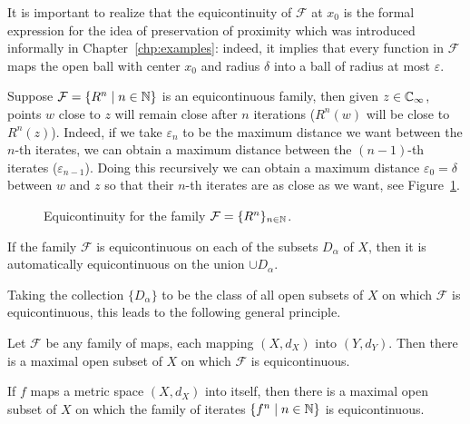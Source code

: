 It is important to realize that the equicontinuity of $\mathcal{F}$ at $x_0$ is
the formal expression for the idea of preservation of proximity which was
introduced informally in Chapter~\ref{chp:examples}: indeed, it implies that
every function in $\mathcal{F}$ maps the open ball with center $x_0$ and radius
$\delta$ into a ball of radius at most $\varepsilon$.

Suppose $\mathcal{F} = \{R^n \mid n \in \mathbb{N}\}$ is an equicontinuous family, then
given $z \in \mathbb{C}_\infty$, points $w$ close to $z$ will remain close after $n$
iterations ($R^n(w)$ will be close to $R^n(z)$). Indeed, if we take
$\varepsilon_n$ to be the maximum distance we want between the $n$-th iterates,
we can obtain a maximum distance between the $(n-1)$-th iterates
($\varepsilon_{n-1}$). Doing this recursively we can obtain a maximum distance
$\varepsilon_0 = \delta$ between $w$ and $z$ so that their $n$-th iterates are
as close as we want, see Figure~\ref{fig:equicontinuity_for_iterates}.
\begin{figure}
    \centering
    \resizebox{\textwidth}{!}{}
    \caption{Equicontinuity for the family $\mathcal{F} = \{R^n\}_{n \in \mathbb{N}}$.}
    \label{fig:equicontinuity_for_iterates}
\end{figure}

\begin{remark}
    If the family $\mathcal{F}$ is equicontinuous on each of the subsets
    $D_\alpha$ of $X$, then it is automatically equicontinuous on the union
    $\cup D_\alpha$.
\end{remark}

Taking the collection $\{D_\alpha\}$ to be the class of all open subsets of $X$
on which $\mathcal{F}$ is equicontinuous, this leads to the following general
principle.

\begin{theorem}
    Let $\mathcal{F}$ be any family of maps, each mapping $(X, d_X)$ into $(Y,
    d_Y)$. Then there is a maximal open subset of $X$ on which $\mathcal{F}$ is
    equicontinuous.
\end{theorem}

\begin{corollary}
    If $f$ maps a metric space $(X, d_X)$ into itself, then there is a maximal
    open subset of $X$ on which the family of iterates $\{f^n \mid n \in \mathbb{N}\}$
    is equicontinuous.
\end{corollary}

